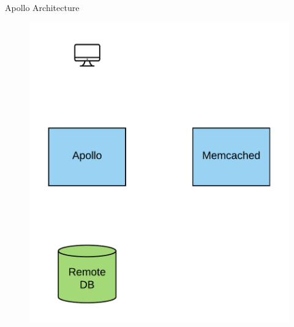 \documentclass[10pt]{beamer}
\begin{document}
\begin{frame}[fragile]{Apollo Architecture}
    \begin{figure}
        \includegraphics[scale=0.17]{apollo_arch_diagram}
    \end{figure}
\end{frame}
\end{document}
